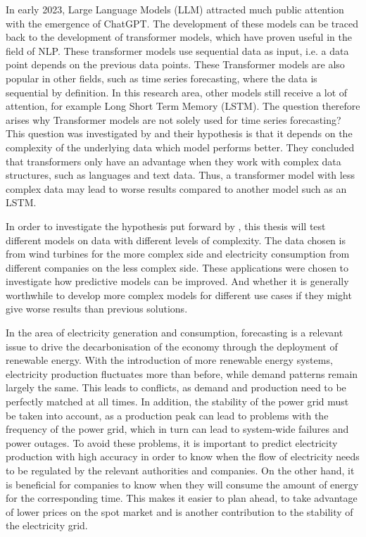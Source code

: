 \documentclass{article}
\begin{document}
In early 2023, Large Language Models (LLM) attracted much public attention with the emergence of ChatGPT. The development of these models can be traced back to the development of transformer models, which have proven useful in the field of NLP. These transformer models use sequential data as input, i.e. a data point depends on the previous data points.
These Transformer models are also popular in other fields, such as time series forecasting, where the data is sequential by definition. In this research area, other models still receive a lot of attention, for example Long Short Term Memory (LSTM). The question therefore arises why Transformer models are not solely used for time series forecasting? This question was investigated by \cite{transformers-effectiveness} and their hypothesis is that it depends on the complexity of the underlying data which model performs better.
They concluded that transformers only have an advantage when they work with complex data structures, such as languages and text data. Thus, a transformer model with less complex data may lead to worse results compared to another model such as an LSTM. \par 
In order to investigate the hypothesis put forward by \cite{transformers-effectiveness}, this thesis will test different models on data with different levels of complexity. The data chosen is from wind turbines for the more complex side and electricity consumption from different companies on the less complex side. These applications were chosen to investigate how predictive models can be improved. And whether it is generally worthwhile to develop more complex models for different use cases if they might give worse results than previous solutions. \par 

In the area of electricity generation and consumption, forecasting is a relevant issue to drive the decarbonisation of the economy through the deployment of renewable energy. With the introduction of more renewable energy systems, electricity production fluctuates more than before, while demand patterns remain largely the same. This leads to conflicts, as demand and production need to be perfectly matched at all times. In addition, the stability of the power grid must be taken into account, as a production peak can lead to problems with the frequency of the power grid, which in turn can lead to system-wide failures and power outages. To avoid these problems, it is important to predict electricity production with high accuracy in order to know when the flow of electricity needs to be regulated by the relevant authorities and companies. On the other hand, it is beneficial for companies to know when they will consume the amount of energy for the corresponding time. This makes it easier to plan ahead, to take advantage of lower prices on the spot market and is another contribution to the stability of the electricity grid.\par 
\end{document}
